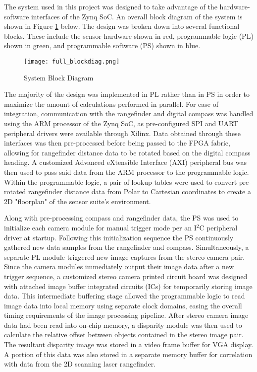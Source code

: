 \label{systemDesign}
The system used in this project was designed to take advantage of the hardware-software interfaces of the Zynq SoC. An overall block diagram of the system is shown in Figure \ref{systemBD} below. The design was broken down into several functional blocks. These include the sensor hardware shown in red, programmable logic (PL) shown in green, and programmable software (PS) shown in blue. 

\begin{figure}[H] 
	\centerline{
	\texttt{[image: full\_blockdiag.png]}
	}
	\caption{System Block Diagram}
	\label{systemBD}
\end{figure}

The majority of the design was implemented in PL rather than in PS in order to maximize the amount of calculations performed in parallel. For ease of integration, communication with the rangefinder and digital compass was handled using the ARM processor of the Zynq SoC, as  pre-configured SPI and UART peripheral drivers were available through Xilinx. Data obtained through these interfaces was then pre-processed before being passed to the FPGA fabric, allowing for rangefinder distance data to be rotated based on the digital compass heading. A customized Advanced eXtensible Interface (AXI) peripheral bus was then used to pass said data from the ARM processor to the programmable logic. Within the programmable logic, a pair of lookup tables were used to convert pre-rotated rangefinder distance data from Polar to Cartesian coordinates to create a 2D "floorplan" of the sensor suite's environment.
\par
Along with pre-processing compass and rangefinder data, the PS was used to initialize each camera module for manual trigger mode per an I$^2$C peripheral driver at startup. Following this initialization sequence the PS continuously gathered new data samples from the rangefinder and compass. Simultaneously, a separate PL module triggered new image captures from the stereo camera pair. Since the camera modules immediately output their image data after a new trigger sequence, a customized stereo camera printed circuit board was designed with attached image buffer integrated circuits (ICs) for temporarily storing image data. This intermediate buffering stage allowed the programmable logic to read image data into local memory using separate clock domains, easing the overall timing requirements of the image processing pipeline. After stereo camera image data had been read into on-chip memory, a disparity module was then used to calculate the relative offset between objects contained in the stereo image pair. The resultant disparity image was stored in a video frame buffer for VGA display. A portion of this data was also stored in a separate memory buffer for correlation with data from the 2D scanning laser rangefinder. 
